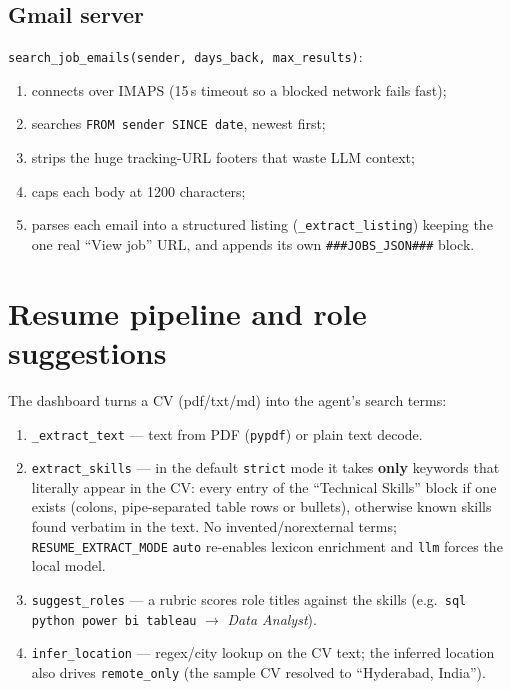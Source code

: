 \documentclass[11pt,a4paper]{article}
\newcommand{\file}[1]{\texttt{\small #1}}
\newcommand{\tool}[1]{\texttt{#1}}
\begin{document}
\subsection{Gmail server}
\tool{search\_job\_emails(sender, days\_back, max\_results)}:
\begin{enumerate}
  \item connects over IMAPS (15\,s timeout so a blocked network fails fast);
  \item searches \tool{FROM sender SINCE date}, newest first;
  \item strips the huge tracking-URL footers that waste LLM context;
  \item caps each body at 1200 characters;
  \item parses each email into a structured listing
        (\tool{\_extract\_listing}) keeping the one real ``View job'' URL,
        and appends its own \tool{###JOBS\_JSON###} block.
\end{enumerate}

\section{Resume pipeline and role suggestions}
\label{sec:resume}

The dashboard turns a CV (pdf/txt/md) into the agent's search terms:

\begin{enumerate}
  \item \tool{\_extract\_text} — text from PDF (\tool{pypdf}) or plain text decode.
  \item \tool{extract\_skills} — in the default \file{strict} mode it takes
        \textbf{only} keywords that literally appear in the CV: every entry of
        the ``Technical Skills'' block if one exists (colons, pipe-separated
        table rows or bullets), otherwise known skills found verbatim in the
        text. No invented/norexternal terms; \tool{RESUME\_EXTRACT\_MODE}
        \file{auto} re-enables lexicon enrichment and \file{llm} forces the
        local model.
  \item \tool{suggest\_roles} — a rubric scores role titles against the skills
        (e.g.\ \tool{sql python power bi tableau} \(\to\) \emph{Data Analyst}).
  \item \tool{infer\_location} — regex/city lookup on the CV text; the inferred
        location also drives \tool{remote\_only} (the sample CV resolved to
        ``Hyderabad, India'').
\end{enumerate}
\end{document}
